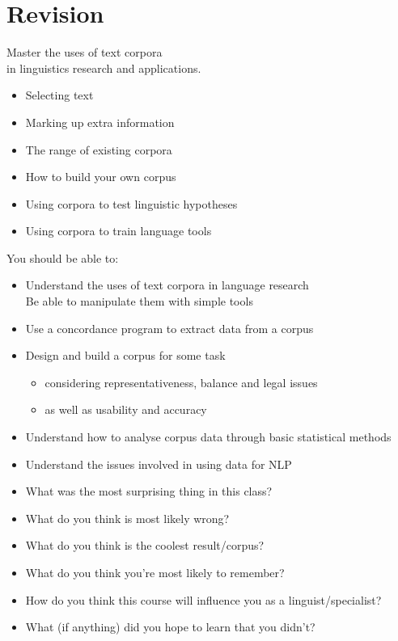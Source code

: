 \documentclass[a4paper,landscape,headrule,footrule,xetex]{foils}
\begin{document}
\section{Revision}
\MyLogo{}



\begin{center}
  \LARGE 
Master the uses of text corpora 
\\ in linguistics research and applications.
\end{center}
\begin{itemize}
\item Selecting text
\item Marking up extra information
\item The range of existing corpora
\item How to build your own corpus
\item Using corpora to test linguistic hypotheses
\item Using corpora to train language tools
\end{itemize}



You should be able to:

\begin{itemize}
\item Understand the uses of text corpora in language research
  \\ Be able to manipulate them with simple tools
\item Use a concordance program to extract data from a corpus
\item Design and build a corpus for some task
\begin{itemize}
\item considering representativeness, balance and legal issues
\item  as well as usability and accuracy
\end{itemize}
\item Understand how to analyse corpus data through basic statistical methods
\item Understand the issues involved in using data for NLP
\end{itemize}



\begin{itemize}
\item What was the most surprising thing in this class?
\item What do you think is most likely wrong?
\item What do you think is the coolest result/corpus?
\item What do you think you’re most likely to
remember?
\item How do you think this course will influence you as a linguist/specialist?
\item What (if anything) did you hope to learn that you didn't?
\end{itemize}
\end{document}
